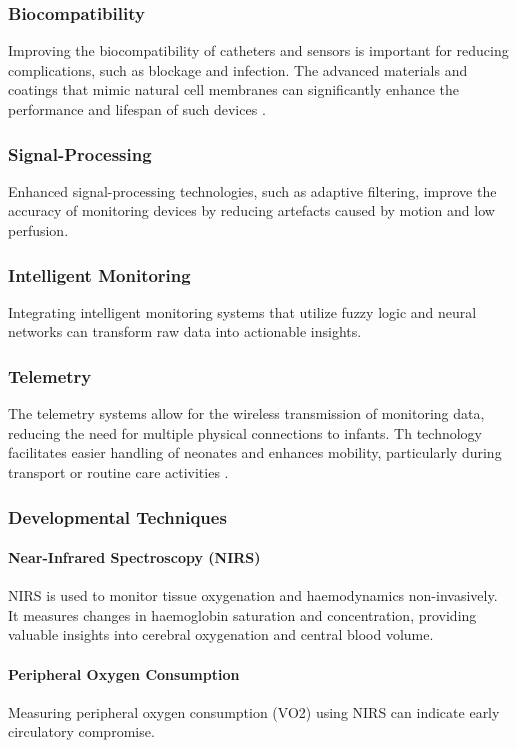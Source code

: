 \documentclass[12pt,journal,compsoc]{IEEEtran}
\begin{document}
\subsubsection{Biocompatibility}
Improving the biocompatibility of catheters and sensors is important for reducing complications, such as blockage and infection. The advanced materials and coatings that mimic natural cell membranes can significantly enhance the performance and lifespan of such devices \cite{IEEEhowto:nicklin}.

\subsubsection{Signal-Processing}
Enhanced signal-processing technologies, such as adaptive filtering, improve the accuracy of monitoring devices by reducing artefacts caused by motion and low perfusion.  

\subsubsection{Intelligent Monitoring}
Integrating intelligent monitoring systems that utilize fuzzy logic and neural networks can transform raw data into actionable insights.  

\subsubsection{Telemetry}
The telemetry systems allow for the wireless transmission of monitoring data, reducing the need for multiple physical connections to infants. Th technology facilitates easier handling of neonates and enhances mobility, particularly during transport or routine care activities \cite{IEEEhowto:nicklin}.

\subsubsection{Developmental Techniques}

\paragraph{Near-Infrared Spectroscopy (NIRS)}
NIRS is used to monitor tissue oxygenation and haemodynamics non-invasively. It measures changes in haemoglobin saturation and concentration, providing valuable insights into cerebral oxygenation and central blood volume. 

\paragraph{Peripheral Oxygen Consumption}
Measuring peripheral oxygen consumption (VO2) using NIRS can indicate early circulatory compromise. 
\end{document}
